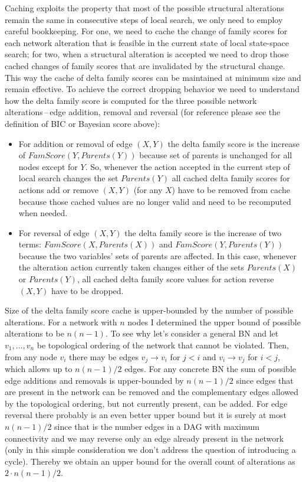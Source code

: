 \documentclass[english,cover]{fitthesis} %
\begin{document}
Caching exploits the property that most of the possible structural alterations remain the same in consecutive steps of local search, we only need to employ careful bookkeeping. For one, we need to cache the change of family scores for each network alteration that is feasible in the current state of local state-space search; for two, when a structural alteration is accepted we need to drop those cached changes of family scores that are invalidated by the structural change. This way the cache of delta family scores can be maintained at minimum size and remain effective.
To achieve the correct dropping behavior we need to understand how the delta family score is computed for the three possible network alterations\,--\,edge addition, removal and reversal (for reference please see the definition of BIC or Bayesian score above):
\begin{itemize}
	\item For addition or removal of edge $(X,Y)$ the delta family score is the increase of $FamScore(Y,Parents(Y))$ because set of parents is unchanged for all nodes except for $Y$. So, whenever the action accepted in the current step of local search changes the set $Parents(Y)$ all cached delta family scores for actions add or remove $(X,Y)$ (for any $X$) have to be removed from cache because those cached values are no longer valid and need to be recomputed when needed.
	\item For reversal of edge $(X,Y)$ the delta family score is the increase of two terms: $FamScore(X,Parents(X))$ and $FamScore(Y,Parents(Y))$ because the two variables' sets of parents are affected. In this case, whenever the alteration action currently taken changes either of the sets $Parents(X)$ or $Parents(Y)$, all cached delta family score values for action reverse $(X,Y)$ have to be dropped.
\end{itemize}

Size of the delta family score cache is upper-bounded by the number of possible alterations. For a network with $n$ nodes I determined the upper bound of possible alterations to be $n(n-1)$. To see why let's consider a general BN and let $v_1, \dots, v_n$ be topological ordering of the network that cannot be violated. Then, from any node $v_i$ there may be edges $v_j \rightarrow v_i$ for $j < i$ and $v_i \rightarrow v_j$  for $i < j$, which allows up to $n(n-1)/2$ edges. For any concrete BN the sum of possible edge additions and removals is upper-bounded by $n(n-1)/2$ since edges that are present in the network can be removed and the complementary edges allowed by the topological ordering, but not currently present, can be added. For edge reversal there probably is an even better upper bound but it is surely at most $n(n-1)/2$ since that is the number edges in a DAG with maximum connectivity and we may reverse only an edge already present in the network (only in this simple consideration we don't address the question of introducing a cycle). Thereby we obtain an upper bound for the overall count of alterations as $2 \cdot n(n-1)/2$.
\end{document}
